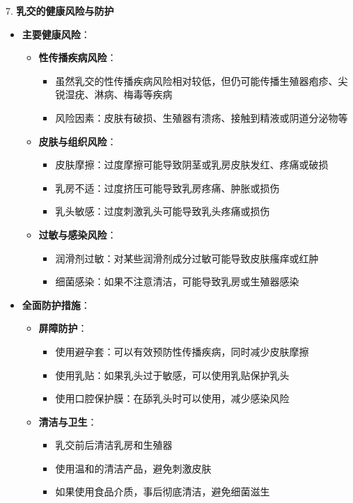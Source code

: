 \documentclass[12pt,UTF8]{ctexbook}
\begin{document}
7. \textbf{乳交的健康风险与防护}
\begin{itemize}
	\item \textbf{主要健康风险}：
	\begin{itemize}
		\item \textbf{性传播疾病风险}：
		\begin{itemize}
			\item 虽然乳交的性传播疾病风险相对较低，但仍可能传播生殖器疱疹、尖锐湿疣、淋病、梅毒等疾病
			\item 风险因素：皮肤有破损、生殖器有溃疡、接触到精液或阴道分泌物等
		\end{itemize}
		\item \textbf{皮肤与组织风险}：
		\begin{itemize}
			\item 皮肤摩擦：过度摩擦可能导致阴茎或乳房皮肤发红、疼痛或破损
			\item 乳房不适：过度挤压可能导致乳房疼痛、肿胀或损伤
			\item 乳头敏感：过度刺激乳头可能导致乳头疼痛或损伤
		\end{itemize}
		\item \textbf{过敏与感染风险}：
		\begin{itemize}
			\item 润滑剂过敏：对某些润滑剂成分过敏可能导致皮肤瘙痒或红肿
			\item 细菌感染：如果不注意清洁，可能导致乳房或生殖器感染
		\end{itemize}
	\end{itemize}
	\item \textbf{全面防护措施}：
	\begin{itemize}
		\item \textbf{屏障防护}：
		\begin{itemize}
			\item 使用避孕套：可以有效预防性传播疾病，同时减少皮肤摩擦
			\item 使用乳贴：如果乳头过于敏感，可以使用乳贴保护乳头
			\item 使用口腔保护膜：在舔乳头时可以使用，减少感染风险
		\end{itemize}
		\item \textbf{清洁与卫生}：
		\begin{itemize}
			\item 乳交前后清洁乳房和生殖器
			\item 使用温和的清洁产品，避免刺激皮肤
			\item 如果使用食品介质，事后彻底清洁，避免细菌滋生
		\end{itemize}

\end{itemize}
\end{itemize}
\end{document}
